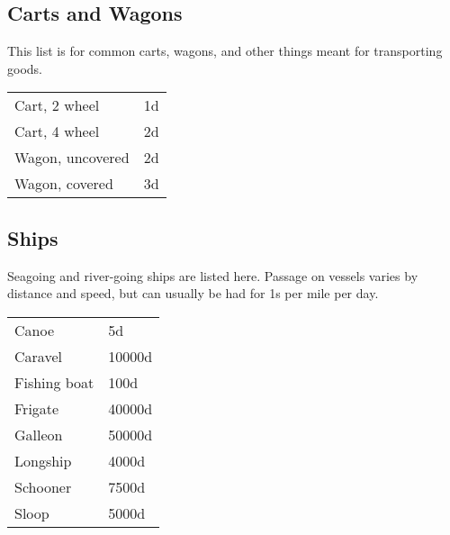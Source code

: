 \subsection{Carts and Wagons}

This list is for common carts, wagons, and other things meant for transporting goods.

\begin{center}
{
\begin{xtabular}{|l|l|}
Cart, 2 wheel & 1d \\
Cart, 4 wheel & 2d \\
Wagon, uncovered & 2d \\
Wagon, covered & 3d \\
\hline
\end{xtabular}
}
\end{center}

\subsection{Ships}

Seagoing and river-going ships are listed here. Passage on vessels varies by distance and speed,
but can usually be had for 1s per mile per day.

\begin{center}
{
\begin{xtabular}{|l|l|}
Canoe & 5d \\
Caravel & 10000d \\
Fishing boat & 100d \\
Frigate & 40000d \\
Galleon & 50000d \\
Longship & 4000d \\
Schooner & 7500d \\
Sloop & 5000d \\
\hline
\end{xtabular}
}
\end{center}
